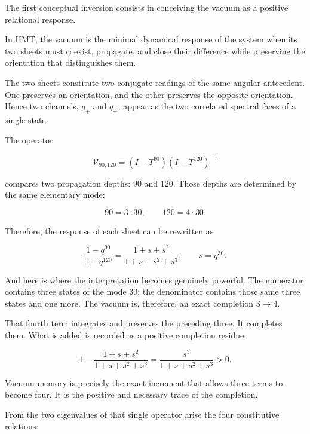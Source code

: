 The first conceptual inversion consists in conceiving the vacuum as a positive relational response.\par

In HMT, the vacuum is the minimal dynamical response of the system when its
two sheets must coexist, propagate, and close their difference while
preserving the orientation that distinguishes them.\par

The two sheets constitute two conjugate readings of the same angular antecedent. One preserves an orientation, and the other preserves the opposite orientation. Hence two channels, \(q_+\) and \(q_-\), appear as the two correlated spectral faces of a single state.\par

The operator\par

\[
\mathcal V_{90,120}
=
(I-T^{90})(I-T^{120})^{-1}
\]

compares two propagation depths: \(90\) and \(120\). Those depths are determined by the same elementary mode:\par

\[
90=3\cdot30,
\qquad
120=4\cdot30.
\]

Therefore, the response of each sheet can be rewritten as\par

\[
\frac{1-q^{90}}{1-q^{120}}
=
\frac{1+s+s^2}{1+s+s^2+s^3},
\qquad
s=q^{30}.
\]

And here is where the interpretation becomes genuinely powerful. The numerator contains three states of the mode \(30\); the denominator contains those same three states and one more. The vacuum is, therefore, an exact completion \(3\to4\).\par

That fourth term integrates and preserves the preceding three. It completes them. What is added is recorded as a positive completion residue:\par

\[
1-\frac{1+s+s^2}{1+s+s^2+s^3}
=
\frac{s^3}{1+s+s^2+s^3}>0.
\]

Vacuum memory is precisely the exact increment that allows three terms to become four. It is the positive and necessary trace of the completion.\par

From the two eigenvalues of that single operator arise the four constitutive relations:\par

